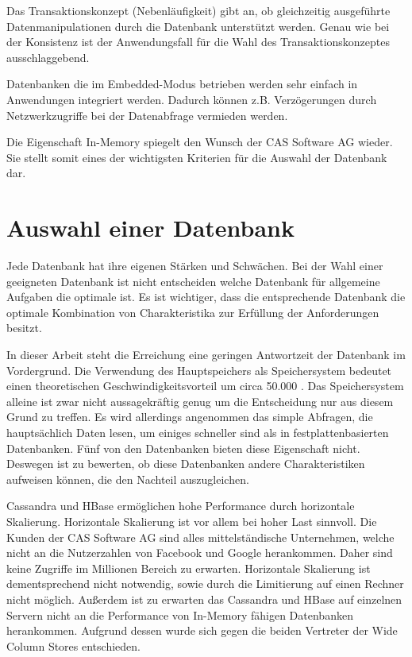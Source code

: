 Das Transaktionskonzept (Nebenläufigkeit) gibt an, ob gleichzeitig ausgeführte Datenmanipulationen durch die Datenbank unterstützt werden. Genau wie bei der Konsistenz ist der Anwendungsfall für die Wahl des Transaktionskonzeptes ausschlaggebend.   

Datenbanken die im Embedded-Modus betrieben werden sehr einfach in Anwendungen integriert werden. Dadurch können z.B. Verzögerungen durch Netzwerkzugriffe bei der Datenabfrage vermieden werden. 

Die Eigenschaft In-Memory spiegelt den Wunsch der CAS Software AG wieder. Sie stellt somit eines der  wichtigsten Kriterien für die Auswahl der Datenbank dar.

\section{Auswahl einer Datenbank}
\label{ch:AnalyseDatenbanken:sec:Ergebniss}

Jede Datenbank hat ihre eigenen Stärken und Schwächen. Bei der Wahl einer geeigneten Datenbank ist nicht entscheiden welche Datenbank für allgemeine Aufgaben die optimale ist. Es ist wichtiger, dass die entsprechende Datenbank die optimale Kombination von Charakteristika zur Erfüllung der Anforderungen besitzt.

In dieser Arbeit steht die Erreichung eine geringen Antwortzeit der Datenbank im Vordergrund. Die Verwendung des Hauptspeichers als Speichersystem bedeutet einen theoretischen Geschwindigkeitsvorteil um circa 50.000 \cite{SWB-394434307}.
Das Speichersystem alleine ist zwar nicht aussagekräftig genug um die Entscheidung nur aus diesem Grund zu treffen. Es wird allerdings angenommen das simple Abfragen, die hauptsächlich Daten lesen, um einiges schneller sind als in festplattenbasierten Datenbanken. Fünf von den Datenbanken bieten diese Eigenschaft nicht. Deswegen ist zu bewerten, ob diese Datenbanken andere Charakteristiken aufweisen können, die den Nachteil auszugleichen.

Cassandra und HBase ermöglichen hohe Performance durch horizontale Skalierung. Horizontale Skalierung ist vor allem bei hoher Last sinnvoll. Die Kunden der CAS Software AG sind alles mittelständische Unternehmen, welche nicht an die Nutzerzahlen von Facebook und Google herankommen. Daher sind keine Zugriffe im Millionen Bereich zu erwarten. Horizontale Skalierung ist dementsprechend nicht notwendig, sowie durch die Limitierung auf einen Rechner nicht möglich. Außerdem ist zu erwarten das Cassandra und HBase auf einzelnen Servern nicht an die Performance von In-Memory fähigen Datenbanken herankommen. Aufgrund dessen wurde sich gegen die beiden Vertreter der Wide Column Stores entschieden.

